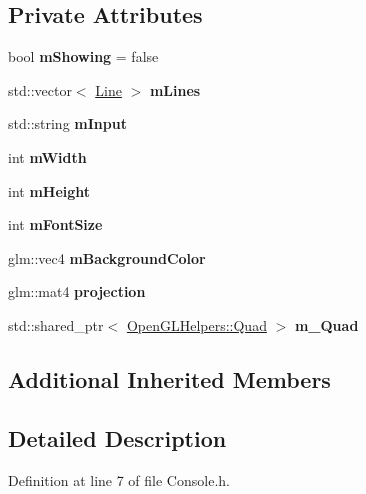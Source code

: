 \subsection*{Private Attributes}
\begin{DoxyCompactItemize}
\item 
bool {\bfseries m\+Showing} = false\hypertarget{class_console_ae6dc828ddc2568d404c469680b8d3c0a}{}\label{class_console_ae6dc828ddc2568d404c469680b8d3c0a}

\item 
std\+::vector$<$ \hyperlink{class_console_1_1_line}{Line} $>$ {\bfseries m\+Lines}\hypertarget{class_console_a8bfc7c9805dd83446285616962985ae0}{}\label{class_console_a8bfc7c9805dd83446285616962985ae0}

\item 
std\+::string {\bfseries m\+Input}\hypertarget{class_console_a43845fdae982a31cfec85169d3b899b2}{}\label{class_console_a43845fdae982a31cfec85169d3b899b2}

\item 
int {\bfseries m\+Width}\hypertarget{class_console_a9914b424fbb8a60918de3166b8b151ae}{}\label{class_console_a9914b424fbb8a60918de3166b8b151ae}

\item 
int {\bfseries m\+Height}\hypertarget{class_console_a43e628863901714b6b825d103c20d9cb}{}\label{class_console_a43e628863901714b6b825d103c20d9cb}

\item 
int {\bfseries m\+Font\+Size}\hypertarget{class_console_a1dc666f022caaf0454de44494f63ec11}{}\label{class_console_a1dc666f022caaf0454de44494f63ec11}

\item 
glm\+::vec4 {\bfseries m\+Background\+Color}\hypertarget{class_console_ab28ca087e70d7835190053f919ea2f93}{}\label{class_console_ab28ca087e70d7835190053f919ea2f93}

\item 
glm\+::mat4 {\bfseries projection}\hypertarget{class_console_a6b6690bb5da085e17ab42f97778094fa}{}\label{class_console_a6b6690bb5da085e17ab42f97778094fa}

\item 
std\+::shared\+\_\+ptr$<$ \hyperlink{class_open_g_l_helpers_1_1_quad}{Open\+G\+L\+Helpers\+::\+Quad} $>$ {\bfseries m\+\_\+\+Quad}\hypertarget{class_console_a4a639bbd4321496f2c3e3a81fb50ff21}{}\label{class_console_a4a639bbd4321496f2c3e3a81fb50ff21}

\end{DoxyCompactItemize}
\subsection*{Additional Inherited Members}


\subsection{Detailed Description}


Definition at line 7 of file Console.\+h.

